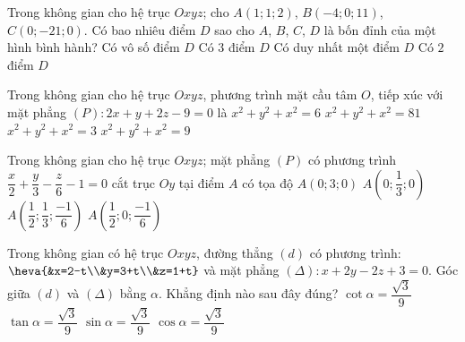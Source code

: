 \begin{ex}%
	Trong không gian cho hệ trục $Oxyz$; cho $A(1;1;2)$, $B(-4;0;11)$, $C(0;-21;0)$. Có bao nhiêu điểm $D$ sao cho $A$, $B$, $C$, $D$ là bốn đỉnh của một hình bình hành?
	\choice
	{Có vô số điểm $D$}
	{Có $3$ điểm $D$}
	{\True Có duy nhất một điểm $D$}
	{Có $2$ điểm $D$}
\end{ex}

\begin{ex}%
	Trong không gian cho hệ trục $Oxyz$, phương trình mặt cầu tâm $O$, tiếp xúc với mặt phẳng $(P)\colon 2x+y+2z-9=0$ là 
	\choice
	{$x^2+y^2+x^2=6$}
	{$x^2+y^2+x^2=81$}
	{$x^2+y^2+x^2=3$}
	{\True $x^2+y^2+x^2=9$}
\end{ex}

\begin{ex}%
	Trong không gian cho hệ trục $Oxyz$; mặt phẳng $(P)$ có phương trình $\dfrac{x}{2}+\dfrac{y}{3}-\dfrac{z}{6}-1=0$ cắt trục $Oy$ tại điểm $A$ có tọa độ 
	\choice
	{\True $A(0;3;0)$}
	{$A\left(0;\dfrac{1}{3};0\right)$}
	{$A\left(\dfrac{1}{2};\dfrac{1}{3};\dfrac{-1}{6}\right)$}
	{$A\left(\dfrac{1}{2};0;\dfrac{-1}{6}\right)$}
\end{ex}

\begin{ex}%
	Trong không gian có hệ trục $Oxyz$, đường thẳng $(d)$ có phương trình: $\heva{&x=2-t\\&y=3+t\\&z=1+t}$ và mặt phẳng $(\Delta)\colon x+2y-2z+3=0$. Góc giữa $(d)$ và $(\Delta)$ bằng $\alpha$. Khẳng định nào sau đây đúng?
	\choice
	{$\cot\alpha=\dfrac{\sqrt{3}}{9}$}
	{$\tan\alpha=\dfrac{\sqrt{3}}{9}$}
	{\True $\sin\alpha=\dfrac{\sqrt{3}}{9}$}
	{$\cos\alpha=\dfrac{\sqrt{3}}{9}$}
\end{ex}

